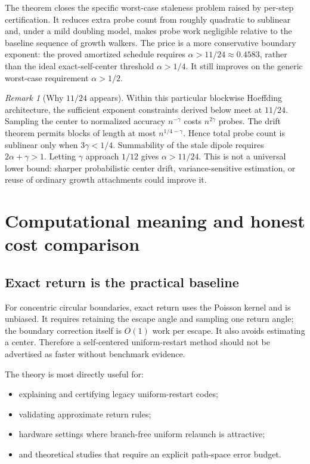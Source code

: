 \documentclass[11pt]{article}
\theoremstyle{mainthm}
\theoremstyle{definition}
\theoremstyle{remark}
\newtheorem{remark}[remark]{Remark}
\begin{document}
\begin{costbox}
The theorem closes the specific worst-case staleness problem raised by per-step certification. It reduces extra probe count from roughly quadratic to sublinear and, under a mild doubling model, makes probe work negligible relative to the baseline sequence of growth walkers. The price is a more conservative boundary exponent: the proved amortized schedule requires $\alpha>11/24\approx0.4583$, rather than the ideal exact-self-center threshold $\alpha>1/4$. It still improves on the generic worst-case requirement $\alpha>1/2$.
\end{costbox}

\begin{remark}[Why $11/24$ appears]
Within this particular blockwise Hoeffding architecture, the sufficient exponent constraints derived below meet at $11/24$. Sampling the center to normalized accuracy $n^{-\gamma}$ costs $n^{2\gamma}$ probes. The drift theorem permits blocks of length at most $n^{1/4-\gamma}$. Hence total probe count is sublinear only when $3\gamma<1/4$. Summability of the stale dipole requires $2\alpha+\gamma>1$. Letting $\gamma$ approach $1/12$ gives $\alpha>11/24$. This is not a universal lower bound: sharper probabilistic center drift, variance-sensitive estimation, or reuse of ordinary growth attachments could improve it.
\end{remark}


\section{Computational meaning and honest cost comparison}

\subsection{Exact return is the practical baseline}

For concentric circular boundaries, exact return uses the Poisson kernel and is unbiased. It requires retaining the escape angle and sampling one return angle; the boundary correction itself is $O(1)$ work per escape. It also avoids estimating a center. Therefore a self-centered uniform-restart method should not be advertised as faster without benchmark evidence.

The theory is most directly useful for:

\begin{itemize}
  \item explaining and certifying legacy uniform-restart codes;
  \item validating approximate return rules;
  \item hardware settings where branch-free uniform relaunch is attractive;
  \item and theoretical studies that require an explicit path-space error budget.
\end{itemize}
\end{document}
